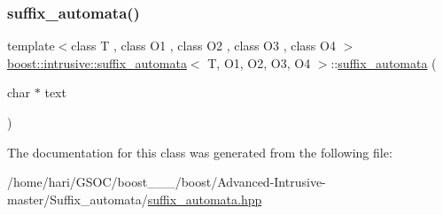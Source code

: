 \subsubsection{\texorpdfstring{suffix\+\_\+automata()}{suffix\_automata()}}
{\footnotesize\ttfamily template$<$class T , class O1 , class O2 , class O3 , class O4 $>$ \\
\hyperlink{classboost_1_1intrusive_1_1suffix__automata}{boost\+::intrusive\+::suffix\+\_\+automata}$<$ T, O1, O2, O3, O4 $>$\+::\hyperlink{classboost_1_1intrusive_1_1suffix__automata}{suffix\+\_\+automata} (\begin{DoxyParamCaption}\item[{char $\ast$}]{text }\end{DoxyParamCaption})\hspace{0.3cm}{\ttfamily [inline]}}



The documentation for this class was generated from the following file\+:\begin{DoxyCompactItemize}
\item 
/home/hari/\+G\+S\+O\+C/boost\+\_\+\_\+\_/boost/\+Advanced-\/\+Intrusive-\/master/\+Suffix\+\_\+automata/\hyperlink{suffix__automata_8hpp}{suffix\+\_\+automata.\+hpp}\end{DoxyCompactItemize}
